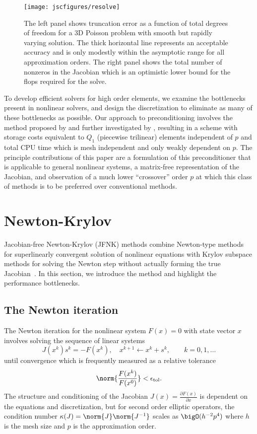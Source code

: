 \begin{figure}
  \centering\texttt{[image: jscfigures/resolve]}
  \caption{The left panel shows truncation error as a function of total degrees of freedom for a 3D Poisson problem with
    smooth but rapidly varying solution.  The thick horizontal line represents an acceptable accuracy and is only
    modestly within the asymptotic range for all approximation orders.  The right panel shows the total number of
    nonzeros in the Jacobian which is an optimistic lower bound for the flops required for the solve.}
  \label{fig:resolve}
\end{figure}

To develop efficient solvers for high order elements, we examine the bottlenecks present in nonlinear solvers, and
design the discretization to eliminate as many of these bottlenecks as possible.  Our approach to preconditioning
involves the method proposed by \citet{orszag1980smp} and further investigated by
\citet{deville1985cps,deville1990fep,heys2005amh,kim2007pbp}, resulting in a scheme with storage costs equivalent to
$Q_1$ (piecewise trilinear) elements independent of $p$ and total CPU time which is mesh independent and only weakly
dependent on $p$.  The principle contributions of this paper are a formulation of this preconditioner that is applicable
to general nonlinear systems, a matrix-free representation of the Jacobian, and observation of a much lower
``crossover'' order $p$ at which this class of methods is to be preferred over conventional methods.

\section{Newton-Krylov}\label{sec:jfnk}
Jacobian-free Newton-Krylov (JFNK) methods combine Newton-type methods for superlinearly convergent solution of
nonlinear equations with Krylov subspace methods for solving the Newton step without actually forming the true
Jacobian~\citep{knoll2004jfn}.  In this section, we introduce the method and highlight the performance bottlenecks.
\subsection{The Newton iteration}
The Newton iteration for the nonlinear system $F(x) = 0$ with state vector $x$ involves solving the sequence of linear
systems
\begin{equation}
  J(x^{k}) s^k = - F(x^k), \quad x^{k+1} \gets x^k + s^k, \qquad k=0,1,\dotsc\label{eq:newton}
\end{equation}
until convergence which is frequently measured as a relative tolerance
\begin{equation*}
 \norm{\frac{F(x^k)}{F(x^0)}} < \epsilon_{\mathrm{tol}} .
\end{equation*}
The structure and conditioning of the Jacobian $J(x) = \frac{\partial F(x)}{\partial x}$ is dependent on the equations
and discretization, but for second order elliptic operators, the condition number $\kappa(J) = \norm{J}\norm{J^{-1}}$
scales as $\bigO(h^{-2} p^4)$ where $h$ is the mesh size and $p$ is the approximation order.

